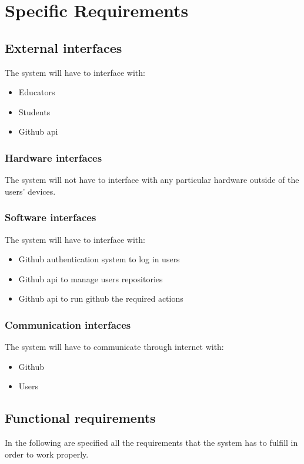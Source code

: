 \documentclass{article}
\begin{document}
\newpage
\section{Specific Requirements}

\subsection{External interfaces}
The system will have to interface with:
\begin{itemize}
\item Educators
\item Students
\item Github api
\end{itemize}
\subsubsection{Hardware interfaces}
The system will not have to interface with any particular hardware outside of the users’ devices.
\subsubsection{Software interfaces}
The system will have to interface with:
\begin{itemize}
\item Github authentication system to log in users
\item Github api to manage users repositories
\item Github api to run github the required actions
\end{itemize}
\subsubsection{Communication interfaces}
The system will have to communicate through internet with:
\begin{itemize}
\item Github
\item Users
\end{itemize}

\subsection{Functional requirements}
In the following are specified all the requirements that the system has to fulfill in order to work properly.\\\\
\end{document}
